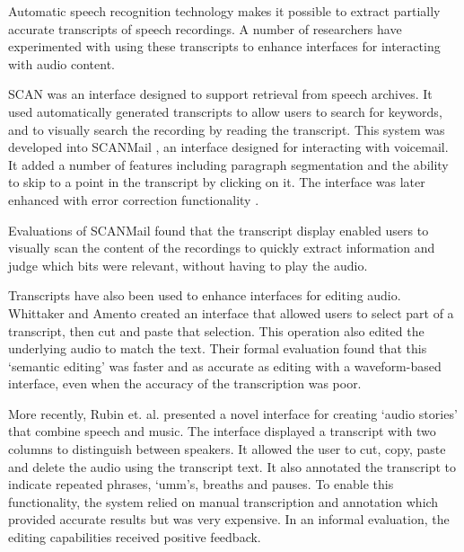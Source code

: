 Automatic speech recognition technology makes it possible to extract partially
accurate transcripts of speech recordings. A number of researchers have
experimented with using these transcripts to enhance interfaces for interacting
with audio content.

SCAN \cite{Whittaker1999} was an interface designed to support retrieval from
speech archives. It used automatically generated transcripts to allow users to
search for keywords, and to visually search the recording by reading the
transcript. This system was developed into SCANMail \cite{Whittaker2002}, an
interface designed for interacting with voicemail. It added a number of
features including paragraph segmentation and the ability to skip to a point in
the transcript by clicking on it. The interface was later enhanced with error
correction functionality \cite{Burke2006}.

Evaluations of SCANMail found that the transcript display enabled users to
visually scan the content of the recordings to quickly extract information and
judge which bits were relevant, without having to play the audio.

Transcripts have also been used to enhance interfaces for editing audio.
Whittaker and Amento \cite{Whittaker2004} created an interface that allowed
users to select part of a transcript, then cut and paste that selection.
This operation also edited the underlying audio to match the text.
Their formal evaluation found that this `semantic editing' was faster and as
accurate as editing with a waveform-based interface, even when the accuracy of
the transcription was poor.

More recently, Rubin et. al. \cite{Rubin2013} presented a novel interface for
creating `audio stories' that combine speech and music. The interface displayed
a transcript with two columns to distinguish between speakers. It allowed the
user to cut, copy, paste and delete the audio using the transcript text.  It
also annotated the transcript to indicate repeated phrases, `umm's, breaths and
pauses. To enable this functionality, the system relied on manual transcription
and annotation which provided accurate results but was very expensive. In an
informal evaluation, the editing capabilities received positive feedback.

